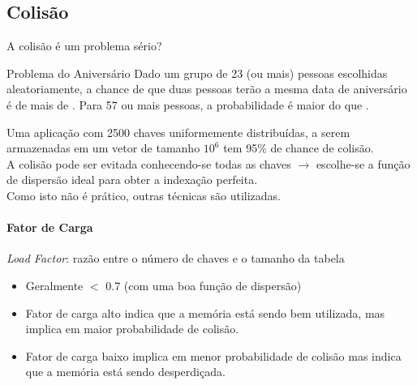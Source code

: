 \documentclass{UnBeamer}%
\begin{document}
	\subsection{Colisão}
	\begin{frame}
		A colisão é um problema sério?\pause
		\begin{block}{Problema do Aniversário}
		Dado um grupo de 23 (ou mais) pessoas escolhidas aleatoriamente, a chance
		de que duas pessoas terão a mesma data de aniversário é de mais de
		. \pause Para 57 ou mais pessoas, a
		probabilidade é maior do que \uncover<3->{\%}.
		\end{block}
		\vfill\pause
		Uma aplicação com 2500 chaves uniformemente distribuídas, a serem
		armazenadas em um vetor de tamanho $10^6$ tem 95\% de chance de colisão.
		\\\vfill\pause
		A colisão pode ser evitada conhecendo-se todas as chaves \pause
		$\rightarrow$ escolhe-se a função de dispersão ideal para obter a indexação perfeita.
		\\\vfill\pause
		Como isto não é prático, outras técnicas são utilizadas.
	\end{frame}

	\begin{frame}[label=notas]
		\framesubtitle{Fator de Carga}

		\emph{Load Factor}: razão entre o número de chaves e o tamanho da tabela
		\begin{itemize}[<+->]
			\item Geralmente $<$ 0.7 (com uma boa função de dispersão)
			\vfill
			\item Fator de carga alto indica que a memória está sendo bem utilizada,
			mas implica em maior probabilidade de colisão.
			\vfill
	\item Fator de carga baixo implica em menor probabilidade de colisão mas indica
	que a memória está sendo desperdiçada.
		\end{itemize}
	\end{frame}
\end{document}
